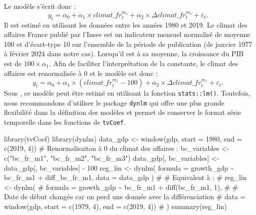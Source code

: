 \documentclass[
  a4paper,
  DIV=11,
  numbers=noendperiod,
  french]{scrartcl}
\newenvironment{Shaded}{\begin{snugshade}}{\end{snugshade}}
\newcommand{\AttributeTok}[1]{\textcolor[rgb]{0.40,0.45,0.13}{#1}}
\newcommand{\CommentTok}[1]{\textcolor[rgb]{0.37,0.37,0.37}{#1}}
\newcommand{\DecValTok}[1]{\textcolor[rgb]{0.68,0.00,0.00}{#1}}
\newcommand{\FunctionTok}[1]{\textcolor[rgb]{0.28,0.35,0.67}{#1}}
\newcommand{\NormalTok}[1]{\textcolor[rgb]{0.00,0.23,0.31}{#1}}
\newcommand{\OtherTok}[1]{\textcolor[rgb]{0.00,0.23,0.31}{#1}}
\newcommand{\SpecialCharTok}[1]{\textcolor[rgb]{0.37,0.37,0.37}{#1}}
\newcommand{\StringTok}[1]{\textcolor[rgb]{0.13,0.47,0.30}{#1}}
\newcommand\1{{\mathds 1}}
\theoremstyle{remark}
\begin{document}
Le modèle s'écrit donc : \[
y_t=\alpha_0 + \alpha_1\times climat\_fr_t^{m_1} + \alpha_2\times \Delta climat\_fr_t^{m_1}+\varepsilon_t.
\] Il est estimé en utilisant les données entre les années 1980 et 2019.
Le climat des affaires France publié par l'Insee est un indicateur
mensuel normalisé de moyenne 100 et d'écart-type 10 sur l'ensemble de la
période de publication (de janvier 1977 à février 2024 dans notre cas).
Lorsqu'il est à sa moyenne, la croissance du PIB est de
\(100\times\alpha_1\). Afin de faciliter l'interprétation de la
constante, le climat des affaires est renormalisée à 0 et le modèle est
donc : \[
y_t=\alpha_0 + \alpha_1\times (climat\_fr_t^{m_1}-100) + \alpha_2\times \Delta climat\_fr_t^{m_1}+\varepsilon_t.
\] Sous , ce modèle peut être estimé en utilisant la
fonction \texttt{stats::lm()}. Toutefois, nous recommandons d'utiliser
le package \texttt{dynlm} \autocite{dynlm} qui offre une plus grande
flexibilité dans la définition des modèles et permet de conserver le
format série temporelle dans les fonctions de \texttt{tvCoef}.

\begin{Shaded}
\begin{Highlighting}[]
\FunctionTok{library}\NormalTok{(tvCoef)}
\FunctionTok{library}\NormalTok{(dynlm)}
\NormalTok{data\_gdp }\OtherTok{\textless{}{-}} \FunctionTok{window}\NormalTok{(gdp, }\AttributeTok{start =} \DecValTok{1980}\NormalTok{, }\AttributeTok{end =} \FunctionTok{c}\NormalTok{(}\DecValTok{2019}\NormalTok{, }\DecValTok{4}\NormalTok{))}
\CommentTok{\# Renormalisaiton à 0 du climat des affaires :}
\NormalTok{bc\_variables }\OtherTok{\textless{}{-}} \FunctionTok{c}\NormalTok{(}\StringTok{"bc\_fr\_m1"}\NormalTok{, }\StringTok{"bc\_fr\_m2"}\NormalTok{, }\StringTok{"bc\_fr\_m3"}\NormalTok{)}
\NormalTok{data\_gdp[, bc\_variables] }\OtherTok{\textless{}{-}}\NormalTok{ data\_gdp[, bc\_variables] }\SpecialCharTok{{-}} \DecValTok{100}
\NormalTok{reg\_lin }\OtherTok{\textless{}{-}} \FunctionTok{dynlm}\NormalTok{(}
  \AttributeTok{formula =}\NormalTok{ growth\_gdp }\SpecialCharTok{\textasciitilde{}}\NormalTok{ bc\_fr\_m1 }\SpecialCharTok{+}\NormalTok{ diff\_bc\_fr\_m1,}
  \AttributeTok{data =}\NormalTok{ data\_gdp}
\NormalTok{)}
\CommentTok{\# \# Equivalent à :}
\CommentTok{\# reg\_lin \textless{}{-} dynlm(}
\CommentTok{\#   formula = growth\_gdp \textasciitilde{} bc\_fr\_m1 + diff(bc\_fr\_m1, 1),}
\CommentTok{\#   \# Date de début changée car on perd une donnée avec la différenciation}
\CommentTok{\#   data = window(gdp, start = c(1979, 4), end = c(2019, 4))}
\CommentTok{\# )}
\FunctionTok{summary}\NormalTok{(reg\_lin)}
\end{Highlighting}
\end{Shaded}
\end{document}
